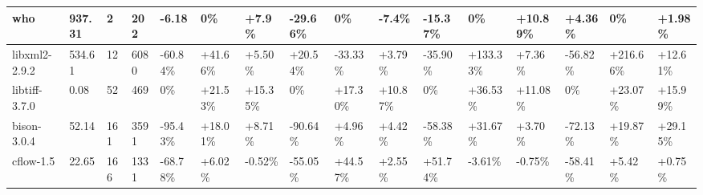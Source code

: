 \begin{table}[t]
\begin{adjustbox}{max width=\textwidth}
\begin{tabular}{|l|l|l|l|l|l|l|l|l|l|l|l|l|l|l|l|}
who                     &   937.31   &     2  &   202        &           -6.18           &       0\%           &     +7.9\%                &    -29.66\%              &       0\%            &       -7.4\%                 &          -15.37\%            &      0\%              &                     +10.89\% & +4.36\%       &   0\%    & +1.98\%            \\ \hline
libxml2-2.9.2     &   534.61      &    12    &   6080    &        -60.84\%              &     +41.66\%               &       +5.50\%                &       +20.54\%                &       -33.33\%       &+3.79\%  &     -35.90\%    &        +133.33\%  &      +7.36\%            &      -56.82\%          &         +216.66\%            &      +12.61\%                            \\ \hline
libtiff-3.7.0        &   0.08          &    52    &  469       &         0\%                  &      +21.53\%                 &       +15.35\%                &        0\%                         &     +17.30\%                  &     +10.87\%                 &          0\% &       +36.53\%   &        +11.08\%             &         0\%               &         +23.07\%              &    +15.99\%                  \\ \hline
bison-3.0.4        &  52.14       &   161     &   3591    &           -95.43\%              &       +18.01\%                 &      +8.71\%               &     -90.64\%               &    +4.96\%      & +4.42\%           &     -58.38\%        &          +31.67\%           &         +3.70\%               &     -72.13\%                &        +19.87\%              &        +29.15\%                        \\ \hline
cflow-1.5            &     22.65    &    166    &           1331                    &   -68.78\%                  &    +6.02\%                  &     -0.52\%                   &       -55.05\%              &        +44.57\%        &    +2.55\%                   &    +51.74\% &        -3.61\%             &        -0.75\%                 &         -58.41\%               &     +5.42\%      &    +0.75\%      \\ \hline

\end{tabular}
\end{adjustbox}
\end{table}
